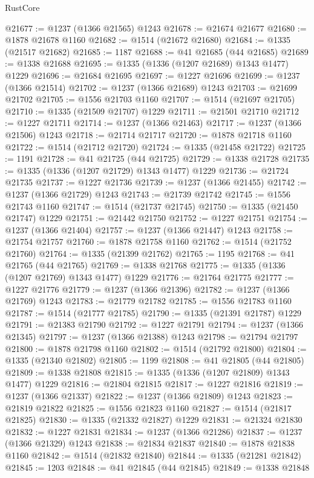 \begin{lexlean}{RustCore}
\begin{coremodule}
@21677 := @1237 (@1366 @21565) @1243
@21678 := @21674 @21677
@21680 := @1878 @21678 @1160
@21682 := @1514 (@21672 @21680)
@21684 := @1335 (@21517 @21682)
@21685 := 1187
@21688 := @41 @21685 (@44 @21685)
@21689 := @1338 @21688
@21695 := @1335 (@1336 (@1207 @21689) @1343 @1477) @1229
@21696 := @21684 @21695
@21697 := @1227 @21696
@21699 := @1237 (@1366 @21514)
@21702 := @1237 (@1366 @21689) @1243
@21703 := @21699 @21702
@21705 := @1556 @21703 @1160
@21707 := @1514 (@21697 @21705)
@21710 := @1335 (@21509 @21707) @1229
@21711 := @21501 @21710
@21712 := @1227 @21711
@21714 := @1237 (@1366 @21463)
@21717 := @1237 (@1366 @21506) @1243
@21718 := @21714 @21717
@21720 := @1878 @21718 @1160
@21722 := @1514 (@21712 @21720)
@21724 := @1335 (@21458 @21722)
@21725 := 1191
@21728 := @41 @21725 (@44 @21725)
@21729 := @1338 @21728
@21735 := @1335 (@1336 (@1207 @21729) @1343 @1477) @1229
@21736 := @21724 @21735
@21737 := @1227 @21736
@21739 := @1237 (@1366 @21455)
@21742 := @1237 (@1366 @21729) @1243
@21743 := @21739 @21742
@21745 := @1556 @21743 @1160
@21747 := @1514 (@21737 @21745)
@21750 := @1335 (@21450 @21747) @1229
@21751 := @21442 @21750
@21752 := @1227 @21751
@21754 := @1237 (@1366 @21404)
@21757 := @1237 (@1366 @21447) @1243
@21758 := @21754 @21757
@21760 := @1878 @21758 @1160
@21762 := @1514 (@21752 @21760)
@21764 := @1335 (@21399 @21762)
@21765 := 1195
@21768 := @41 @21765 (@44 @21765)
@21769 := @1338 @21768
@21775 := @1335 (@1336 (@1207 @21769) @1343 @1477) @1229
@21776 := @21764 @21775
@21777 := @1227 @21776
@21779 := @1237 (@1366 @21396)
@21782 := @1237 (@1366 @21769) @1243
@21783 := @21779 @21782
@21785 := @1556 @21783 @1160
@21787 := @1514 (@21777 @21785)
@21790 := @1335 (@21391 @21787) @1229
@21791 := @21383 @21790
@21792 := @1227 @21791
@21794 := @1237 (@1366 @21345)
@21797 := @1237 (@1366 @21388) @1243
@21798 := @21794 @21797
@21800 := @1878 @21798 @1160
@21802 := @1514 (@21792 @21800)
@21804 := @1335 (@21340 @21802)
@21805 := 1199
@21808 := @41 @21805 (@44 @21805)
@21809 := @1338 @21808
@21815 := @1335 (@1336 (@1207 @21809) @1343 @1477) @1229
@21816 := @21804 @21815
@21817 := @1227 @21816
@21819 := @1237 (@1366 @21337)
@21822 := @1237 (@1366 @21809) @1243
@21823 := @21819 @21822
@21825 := @1556 @21823 @1160
@21827 := @1514 (@21817 @21825)
@21830 := @1335 (@21332 @21827) @1229
@21831 := @21324 @21830
@21832 := @1227 @21831
@21834 := @1237 (@1366 @21286)
@21837 := @1237 (@1366 @21329) @1243
@21838 := @21834 @21837
@21840 := @1878 @21838 @1160
@21842 := @1514 (@21832 @21840)
@21844 := @1335 (@21281 @21842)
@21845 := 1203
@21848 := @41 @21845 (@44 @21845)
@21849 := @1338 @21848

\end{coremodule}
\end{lexlean}
